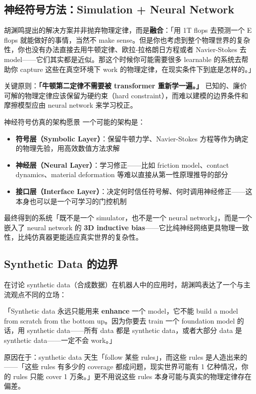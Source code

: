 \documentclass[a4paper]{article}
\begin{document}
\subsection{神经符号方法：Simulation + Neural Network}

胡渊鸣提出的解决方案并非抛弃物理定律，而是\textbf{融合}：「用 1T flops 去预测一个 E flops 就能做好的事情，当然不 make sense。但是你也考虑到整个物理世界的复杂性，你也没有办法直接去用牛顿定律、欧拉-拉格朗日方程或者 Navier-Stokes 去 model——它们其实都是近似。那这个时候你可能需要很多 learnable 的系统去帮助你 capture 这些在真空环境下 work 的物理定律，在现实条件下到底是怎样的。」

关键原则：\textbf{「牛顿第二定律不需要被 transformer 重新学一遍。」} 已知的、廉价可解的物理定律应该保留为硬约束（hard constraint），而难以建模的边界条件和摩擦模型应由 neural network 来学习校正。

\begin{knowledgebox}{神经符号仿真的架构愿景}
一个可能的架构是：
\begin{itemize}
    \item \textbf{符号层（Symbolic Layer）}：保留牛顿力学、Navier-Stokes 方程等作为确定的物理先验，用高效数值方法求解
    \item \textbf{神经层（Neural Layer）}：学习修正——比如 friction model、contact dynamics、material deformation 等难以直接从第一性原理推导的部分
    \item \textbf{接口层（Interface Layer）}：决定何时信任符号解、何时调用神经修正——这本身也可以是一个可学习的门控机制
\end{itemize}
最终得到的系统「既不是一个 simulator，也不是一个 neural network」，而是一个嵌入了 neural network 的 \textbf{3D inductive bias}——它比纯神经网络更具物理一致性，比纯仿真器更能适应真实世界的复杂性。
\end{knowledgebox}

\subsection{Synthetic Data 的边界}

在讨论 synthetic data（合成数据）在机器人中的应用时，胡渊鸣表达了一个与主流观点不同的立场：

「Synthetic data 永远只能用来 \textbf{enhance} 一个 model，它不能 build a model from scratch from the bottom up。因为你要去 train 一个 foundation model 的话，用 synthetic data——所有 data 都是 synthetic data，或者大部分 data 是 synthetic data——一定不会 work。」

原因在于：synthetic data 天生「follow 某些 rules」，而这些 rules 是人造出来的——「这些 rules 有多少的 coverage 都成问题，现实世界可能有 1 亿种情况，你的 rules 只能 cover 1 万条。」更不用说这些 rules 本身可能与真实的物理定律存在偏差。
\end{document}
